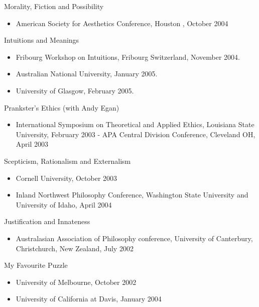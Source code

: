 \documentclass[
  10pt,
  letterpaper,
  DIV=11,
  numbers=noendperiod,
  twoside]{scrartcl}
\providecommand{\tightlist}{%
  \setlength{\itemsep}{0pt}\setlength{\parskip}{0pt}}
\begin{document}
Morality, Fiction and Possibility

\begin{itemize}
\tightlist
\item
  American Society for Aesthetics Conference, Houston , October 2004
\end{itemize}

Intuitions and Meanings

\begin{itemize}
\tightlist
\item
  Fribourg Workshop on Intuitions, Fribourg Switzerland, November 2004.
\item
  Australian National University, January 2005.
\item
  University of Glasgow, February 2005.
\end{itemize}

Prankster's Ethics (with Andy Egan)

\begin{itemize}
\tightlist
\item
  International Symposium on Theoretical and Applied Ethics, Louisiana
  State University, February 2003 - APA Central Division Conference,
  Cleveland OH, April 2003
\end{itemize}

Scepticism, Rationalism and Externalism

\begin{itemize}
\tightlist
\item
  Cornell University, October 2003
\item
  Inland Northwest Philosophy Conference, Washington State University
  and University of Idaho, April 2004
\end{itemize}

Justification and Innateness

\begin{itemize}
\tightlist
\item
  Australasian Association of Philosophy conference, University of
  Canterbury, Christchurch, New Zealand, July 2002
\end{itemize}

\newpage

My Favourite Puzzle

\begin{itemize}
\tightlist
\item
  University of Melbourne, October 2002
\item
  University of California at Davis, January 2004
\end{itemize}
\end{document}
